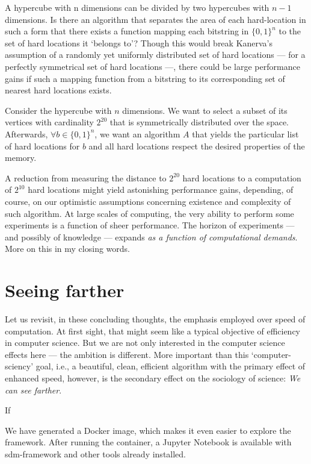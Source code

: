 A hypercube with n dimensions can be divided by two hypercubes with $n-1$ dimensions. Is there an algorithm that separates the area of each hard-location in such a form that there exists a function mapping each bitstring in $\{0,1\}^n$ to the set of hard locations it `belongs to'?  Though this would break Kanerva's assumption of a randomly yet uniformly distributed set of hard locations --- for a perfectly symmetrical set of hard locations ---, there could be large performance gains if such a mapping function from a bitstring to its corresponding set of nearest hard locations exists.

Consider the hypercube with $n$ dimensions.  We want to select a subset of its vertices with cardinality $2^{20}$ that is symmetrically distributed over the space. Afterwards, $\forall b \in \{ 0,1\} ^n$, we want an algorithm $A$ that yields the particular list of hard locations for $b$ and all hard locations respect the desired properties of the memory.

A reduction from measuring the distance to $2^{20}$ hard locations to a computation of $2^{10}$ hard locations might yield astonishing performance gains, depending, of course, on our optimistic assumptions concerning existence and complexity of such algorithm.  At large scales of computing, the very ability to perform some experiments is a function of sheer performance. The horizon of experiments --- and possibly of knowledge --- expands \emph{as a function of computational demands}. More on this in my closing words.

\section{Seeing farther}

Let us revisit, in these concluding thoughts, the emphasis employed over speed of computation.  At first sight, that might seem like a typical objective of efficiency in computer science. But we are not only interested in the computer science effects here --- the ambition is different. More important than this `computer-sciency' goal, i.e., a beautiful, clean, efficient algorithm with the primary effect of enhanced speed, however, is the secondary effect on the sociology of science:  \emph{We can see farther}.

If

We have generated a Docker image, which makes it even easier to explore the framework. After running the container, a Jupyter Notebook is available with sdm-framework and other tools already installed.


